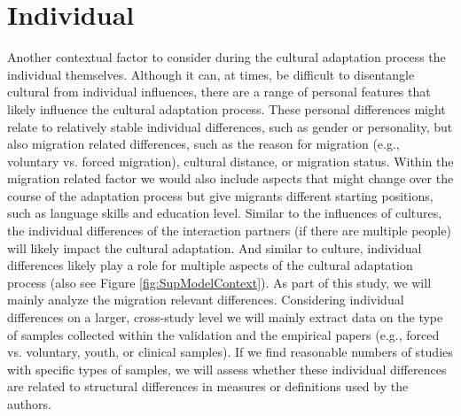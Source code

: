 \documentclass[man, 12pt, a4paper]{apa7}
\begin{document}
\section{Individual} 
Another contextual factor to consider during the cultural adaptation process the individual themselves. Although it can, at times, be difficult to disentangle cultural from individual influences, there are a range of personal features that likely influence the cultural adaptation process. These personal differences might relate to relatively stable individual differences, such as gender or personality, but also migration related differences, such as the reason for migration (e.g., voluntary vs. forced migration), cultural distance, or migration status. Within the migration related factor we would also include aspects that might change over the course of the adaptation process but give migrants different starting positions, such as language skills and education level.
Similar to the influences of cultures, the individual differences of the interaction partners (if there are multiple people) will likely impact the cultural adaptation. And similar to culture, individual differences likely play a role for multiple aspects of the cultural adaptation process (also see Figure \ref{fig:SupModelContext}). As part of this study, we will mainly analyze the migration relevant differences. Considering individual differences on a larger, cross-study level we will mainly extract data on the type of samples collected within the validation and the empirical papers (e.g., forced vs. voluntary, youth, or clinical samples). If we find reasonable numbers of studies with specific types of samples, we will assess whether these individual differences are related to structural differences in measures or definitions used by the authors.
\end{document}

